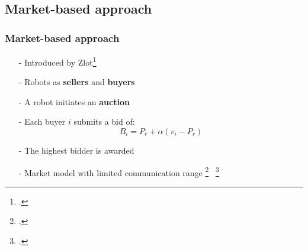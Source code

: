 \subsection{Market-based approach}
\begin{frame}
	\frametitle{Market-based approach}
	\begin{itemize}
		\item[-] Introduced by Zlot\footcite{Zlot2002}
		\item[-] Robots as \textbf{sellers} and \textbf{buyers}
		\item[-] A robot initiates an \textbf{auction}
		\item[-] Each buyer $i$ submits a bid of:
		\begin{equation}
			B_{i} = P_{r} + \alpha(v_{i} - P_{r})
		\end{equation}
		\item[-] The highest bidder is awarded 		
		\item[-] Market model with limited communication range \footcite{Sheng2006} $\,$ \footcite{Michael2008}
		
%		
		\end{itemize}
	
\end{frame}

